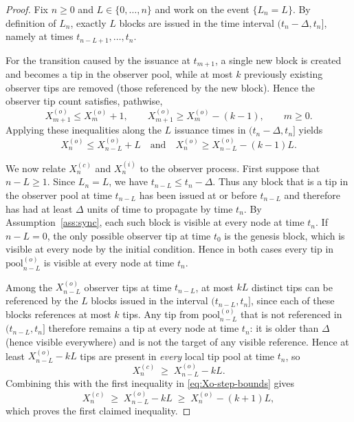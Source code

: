 \documentclass[a4paper,12pt,oneside,reqno]{amsart}
\newcommand{\1}{{\mathbf 1}}
\newcommand{\pool}{\mathrm{pool}}
\begin{document}
\begin{proof}
	Fix $n\ge0$ and $L\in\{0,\ldots,n\}$ and work on the event $\{L_n=L\}$. By definition of $L_n$, exactly $L$ blocks are issued in the time interval $(t_n-\Delta,t_n]$, namely at times $t_{n-L+1},\ldots,t_n$.
	
	For the transition caused by the issuance at $t_{m+1}$, a single new block is created and becomes a tip in the observer pool, while at most $k$ previously existing observer tips are removed (those referenced by the new block). Hence the observer tip count satisfies, pathwise,
	\[
	   X_{m+1}^{(o)} \le X_m^{(o)} + 1,\qquad X_{m+1}^{(o)} \ge X_m^{(o)} - (k-1),\qquad m\ge 0.
	\]
	Applying these inequalities along the $L$ issuance times in $(t_n-\Delta,t_n]$ yields
	\begin{equation}\label{eq:Xo-step-bounds}
	   X_n^{(o)} \le X_{n-L}^{(o)} + L
	   \quad\text{and}\quad
	   X_n^{(o)} \ge X_{n-L}^{(o)} - (k-1)L.
	\end{equation}
	
	We now relate $X_n^{(c)}$ and $X_n^{(i)}$ to the observer process. First suppose that $n-L\ge1$. Since $L_n=L$, we have $t_{n-L}\le t_n-\Delta$. Thus any block that is a tip in the observer pool at time $t_{n-L}$ has been issued at or before $t_{n-L}$ and therefore has had at least $\Delta$ units of time to propagate by time $t_n$. By Assumption~\ref{ass:sync}, each such block is visible at every node at time $t_n$. If $n-L=0$, the only possible observer tip at time $t_0$ is the genesis block, which is visible at every node by the initial condition. Hence in both cases every tip in $\pool_{n-L}^{(o)}$ is visible at every node at time $t_n$.
	
	Among the $X_{n-L}^{(o)}$ observer tips at time $t_{n-L}$, at most $kL$ distinct tips can be referenced by the $L$ blocks issued in the interval $(t_{n-L},t_n]$, since each of these blocks references at most $k$ tips. Any tip from $\pool_{n-L}^{(o)}$ that is not referenced in $(t_{n-L},t_n]$ therefore remains a tip at every node at time $t_n$: it is older than $\Delta$ (hence visible everywhere) and is not the target of any visible reference. Hence at least $X_{n-L}^{(o)}-kL$ tips are present in \emph{every} local tip pool at time $t_n$, so
	\[
	   X_n^{(c)} \;\ge\; X_{n-L}^{(o)} - kL.
	\]
	Combining this with the first inequality in \eqref{eq:Xo-step-bounds} gives
	\[
	   X_n^{(c)} \;\ge\; X_{n-L}^{(o)} - kL \;\ge\; X_n^{(o)} - (k+1)L,
	\]
	which proves the first claimed inequality.
	

\end{proof}
\end{document}
